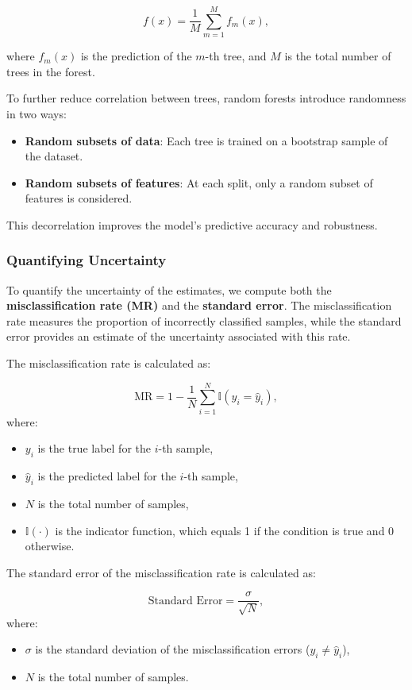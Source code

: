 \documentclass[fleqn,moreauthors,10pt]{ds_report}
\begin{document}
\[
f(x) = \frac{1}{M} \sum_{m=1}^{M} f_m(x),
\]

where \( f_m(x) \) is the prediction of the \( m \)-th tree, and \( M \) is the total number of trees in the forest.

To further reduce correlation between trees, random forests introduce randomness in two ways:
\begin{itemize}
    \item \textbf{Random subsets of data}: Each tree is trained on a bootstrap sample of the dataset.
    \item \textbf{Random subsets of features}: At each split, only a random subset of features is considered.
\end{itemize}

This decorrelation improves the model's predictive accuracy and robustness.


\subsubsection*{Quantifying Uncertainty}


To quantify the uncertainty of the estimates, we compute both the \textbf{misclassification rate (MR)} and the \textbf{standard error}. The misclassification rate measures the proportion of incorrectly classified samples\cite{MLPP}, while the standard error provides an estimate of the uncertainty associated with this rate.

The misclassification rate is calculated as:

\[
\text{MR} = 1 - \frac{1}{N} \sum_{i=1}^{N} \mathbb{I}(y_i = \hat{y}_i),
\]
where:
\begin{itemize}
    \item \( y_i \) is the true label for the \( i \)-th sample,
    \item \( \hat{y}_i \) is the predicted label for the \( i \)-th sample,
    \item \( N \) is the total number of samples,
    \item \( \mathbb{I}(\cdot) \) is the indicator function, which equals 1 if the condition is true and 0 otherwise.
\end{itemize}

The standard error of the misclassification rate is calculated as:

\[
\text{Standard Error} = \frac{\sigma}{\sqrt{N}},
\]
where:
\begin{itemize}
    \item \( \sigma \) is the standard deviation of the misclassification errors (\( y_i \neq \hat{y}_i \)),
    \item \( N \) is the total number of samples.
\end{itemize}
\end{document}
